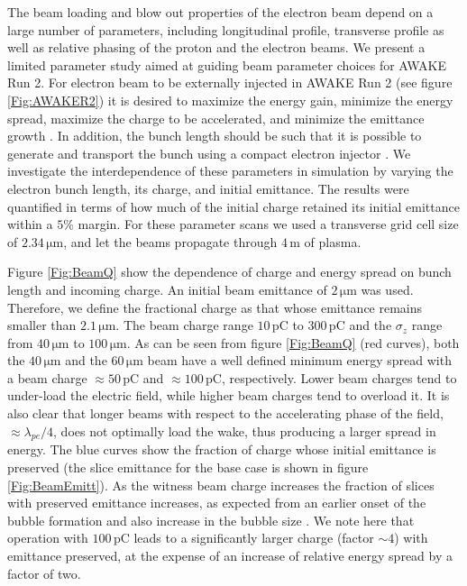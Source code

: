 \documentclass[aps,prstab,reprint,amsmath,amssymb,groupedaddress]{revtex4-1}
\newcommand{\unit}[1]{\,\mathrm{#1}}
\begin{document}
The beam loading and blow out properties of the electron beam depend on a large number of parameters, including %
longitudinal profile, %
transverse profile as well as %
relative phasing of the proton and the electron beams. We present a limited parameter study aimed at guiding beam
parameter choices for AWAKE Run 2.
For electron beam to be externally injected in AWAKE Run 2 (see figure \ref{Fig:AWAKER2}) it is desired to maximize the
energy gain, minimize the energy spread, maximize the charge to be accelerated, and minimize the emittance growth
\cite{adli:2016}. In addition, the bunch length should be such that it is possible to generate and transport the bunch
using a compact electron injector \cite{adli:2016}. We investigate the interdependence of these parameters in simulation
by varying the electron bunch length, its charge, and initial emittance. The results were quantified in terms of how
much of the initial charge retained its initial emittance within a $5\%$ margin. For these parameter scans we used a
transverse grid cell size of $2.34\unit{\mu m}$, and let the beams propagate through $4\unit{m}$ of plasma.

Figure \ref{Fig:BeamQ}  show the dependence of %
charge and energy spread on bunch length and %
incoming charge.  An initial beam emittance of $2\unit{\mu m}$ was used. Therefore, we define the fractional charge as
that whose emittance remains smaller than $2.1\unit{\mu m}$. %
The beam charge range $10\unit{pC}$ to $300\unit{pC}$ and %
the $\sigma_{z}$ range from $40\unit{\mu m}$ to $100\unit{\mu m}$.  As can be seen from figure \ref{Fig:BeamQ} %
(red curves), both the $40\unit{\mu m}$ and the $60\unit{\mu m}$ beam %
have a well defined minimum energy spread with a beam charge $\approx 50\unit{pC}$ and $\approx 100\unit{pC}$,
respectively. Lower beam charges tend to under-load the electric field, while higher beam charges tend to overload it.
It is also clear that longer beams with respect to the accelerating phase of the field, $\approx\lambda_{pe}/4$, %
does not optimally load the wake, thus producing a larger spread in energy. The blue curves show the fraction of
charge whose initial emittance is preserved (the slice emittance for the base case is shown in figure
\ref{Fig:BeamEmitt}). As the witness beam charge increases the fraction of slices with preserved emittance increases, as
expected from an earlier onset of the bubble formation and also increase in the bubble size \cite{lu:2006-1, lu:2006}.
We note here that operation with $100\unit{pC}$ leads to a significantly larger charge (factor $\sim 4$) with emittance
preserved, at the expense of an increase of relative energy spread by a factor of two. %
\end{document}
